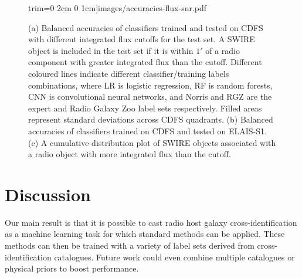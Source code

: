 \documentclass[fleqn,usenatbib,usedcolumn]{mnras}
\begin{document}
\begin{figure}
                     trim={0 2cm 0 1cm}]{images/accuracies-flux-snr.pdf}
    \caption{(a) Balanced accuracies of classifiers trained and tested on CDFS
      with different integrated flux cutoffs for the test set. A SWIRE object
      is included in the test set if it is within $1'$ of a radio component
      with greater integrated flux than the cutoff. Different coloured lines
      indicate different classifier/training labels combinations, where LR is
      logistic regression, RF is random forests, CNN is convolutional neural
      networks, and Norris and RGZ are the expert and Radio Galaxy Zoo label
      sets respectively. Filled areas represent standard deviations across
      CDFS quadrants. (b) Balanced accuracies of classifiers trained on CDFS
      and tested on ELAIS-S1. (c) A cumulative distribution plot of SWIRE
      objects associated with a radio object with more integrated flux than
      the cutoff.}
    \label{fig:accuracies-flux}
  \end{figure}


\section{Discussion}

  Our main result is that it is possible to cast radio host galaxy
  cross-identification as a machine learning task for which standard methods
  can be applied. These methods can then be trained with a variety of label
  sets derived from cross-identification catalogues. Future work could even
  combine multiple catalogues or physical priors to boost performance.
\end{document}

